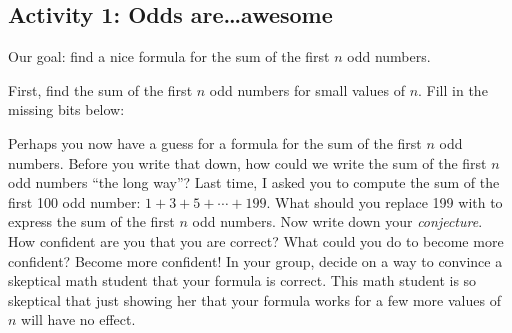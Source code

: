 \documentclass[11pt]{exam}
\begin{document}
\subsection*{Activity 1: Odds are\ldots awesome}
Our goal: find a nice formula for the sum of the first $n$ odd numbers.
\begin{questions}
  \question First, find the sum of the first $n$ odd numbers for small values of $n$.  Fill in the missing bits below:
  \begin{multicols}{2}

  \end{multicols}

  \question Perhaps you now have a guess for a formula for the sum of the first $n$ odd numbers.  Before you write that down, how could we write the sum of the first $n$ odd numbers ``the long way''?  Last time, I asked you to compute the sum of the first 100 odd number: $1 + 3 + 5 + \cdots + 199$.  What should you replace 199 with to express the sum of the first $n$ odd numbers.
  \vfill
  \question Now write down your {\em conjecture}.  How confident are you that you are correct?  What could you do to become more confident?
  \vfill
  \question Become more confident!  In your group, decide on a way to convince a skeptical math student that your formula is correct.  This math student is so skeptical that just showing her that your formula works for a few more values of $n$ will have no effect.  
  \vfill
  \vfill

\end{questions}
\end{document}
